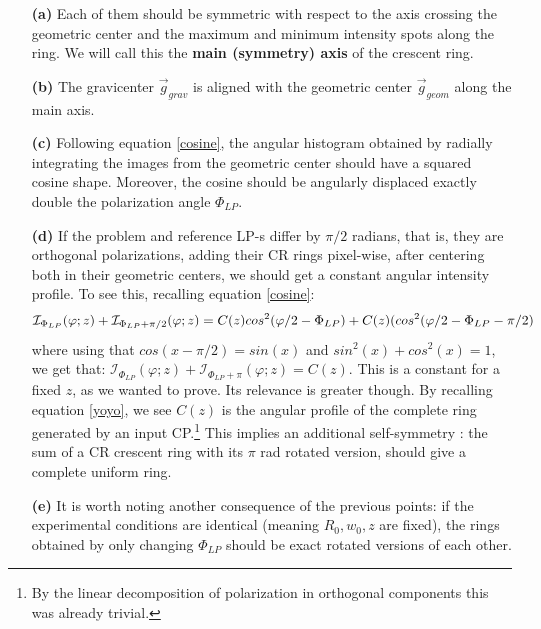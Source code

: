 \documentclass[11pt, a4paper, twoside]{article} %
\begin{document}
\begin{itemize}
\item[\bf (a)] Each of them should be symmetric with respect to the axis crossing the geometric center and the maximum and minimum intensity spots along the ring. We will call this the {\bf main (symmetry) axis} of the crescent ring.\vspace{-0.1cm}
\item[\bf (b)] The gravicenter $\vec{g}_{grav}$ is aligned with the geometric center $\vec{g}_{geom}$ along the main axis.\vspace{-0.1cm}
\item[\bf (c)] Following equation \eqref{cosine}, the angular histogram obtained by radially integrating the images from the geometric center should have a squared cosine shape. Moreover, the cosine should be angularly displaced exactly double the polarization angle $\Phi_{LP}$.\vspace{-0.1cm}
\item[\bf (d)] If the problem and reference LP-s differ by $\pi/2$ radians, that is, they are orthogonal polarizations, adding their CR rings pixel-wise, after centering both in their geometric centers, we should get a constant angular intensity profile. To see this, recalling equation \eqref{cosine}:\vspace{-0.05cm}
\begin{equation}
\mathcal{I}_{\Phi_{LP}}(\varphi;z)+\mathcal{I}_{\Phi_{LP}+\pi/2}(\varphi;z) = C(z)cos^2(\varphi/2-\Phi_{LP})+C(z)(cos^2(\varphi/2-\Phi_{LP}-\pi/2)\vspace{-0.05cm}
\end{equation}
where using that $cos(x-\pi/2)=sin(x)$ and $sin^2(x)+cos^2(x)=1$, we get that: $\mathcal{I}_{\Phi_{LP}}(\varphi;z)+\mathcal{I}_{\Phi_{LP}+\pi}(\varphi;z) = C(z)$. This is a constant for a fixed $z$, as we wanted to prove. Its relevance is greater though. By recalling equation \eqref{yoyo}, we see $C(z)$ is the angular profile of the complete ring generated by an input CP.\footnote{By the linear decomposition of polarization in orthogonal components this was already trivial.} This implies an additional self-symmetry : the sum of a CR crescent ring with its $\pi$ rad rotated version, should give a complete uniform ring.\vspace{-0.1cm}
\item[\bf (e)] It is worth noting another consequence of the previous points: if the experimental conditions are identical (meaning $R_0,w_0,z$ are fixed), the rings obtained by only changing $\Phi_{LP}$ should be exact rotated versions of each other.\vspace{-0.3cm}
\end{itemize}
\end{document}

